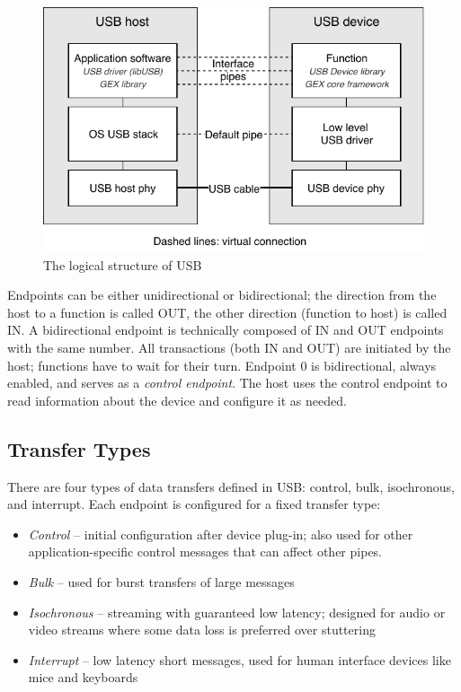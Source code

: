 \begin{figure}[h]
	\centering
	\includegraphics[scale=1] {img/usb-logical-redraw.pdf}
	\caption{\label{fig:usb_logical}The logical structure of USB}
\end{figure}

Endpoints can be either unidirectional or bidirectional; the direction from the host to a function is called OUT, the other direction (function to host) is called IN. A bidirectional endpoint is technically composed of IN and OUT endpoints with the same number. All transactions (both IN and OUT) are initiated by the host; functions have to wait for their turn. Endpoint 0 is bidirectional, always enabled, and serves as a \textit{control endpoint}. The host uses the control endpoint to read information about the device and configure it as needed.

\subsection{Transfer Types}

There are four types of data transfers defined in \gls{USB}: control, bulk, isochronous, and interrupt. Each endpoint is configured for a fixed transfer type:

\begin{itemize}
	\item \textit{Control} -- initial configuration after device plug-in; also used for other application-specific control messages that can affect other pipes.
	\item \textit{Bulk} -- used for burst transfers of large messages
	\item \textit{Isochronous} -- streaming with guaranteed low latency; designed for audio or video streams where some data loss is preferred over stuttering
	\item \textit{Interrupt} -- low latency short messages, used for human interface devices like mice and keyboards
\end{itemize}

